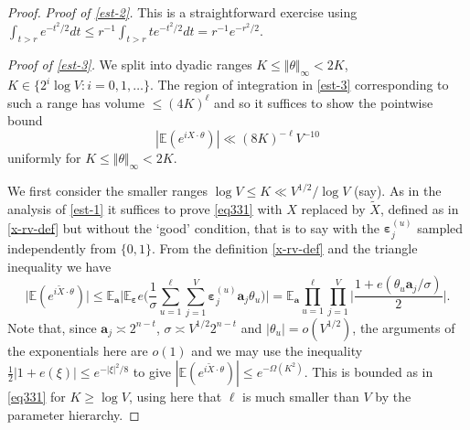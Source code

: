\documentclass[11pt,reqno]{amsart}
\numberwithin{equation}{section}
\theoremstyle{definition}
\theoremstyle{remark}
\newcommand{\mb}{\mathbb}
\newcommand{\mbf}{\mathbf}
\newcommand{\eps}{\varepsilon}
\def\boldeps{\boldsymbol\eps}
\renewcommand{\le}{\leqslant}
\renewcommand{\ge}{\geqslant}
\begin{document}
\begin{proof}
\emph{Proof of \cref{est-2}.} This is a straightforward exercise using $\int_{t > r} e^{-t^2/2} dt \le r^{-1} \int_{t > r} t e^{-t^2/2} dt = r^{-1} e^{-r^2/2}$.\vspace*{8pt}

\emph{Proof of \cref{est-3}.} We split into dyadic ranges $K \le \Vert \theta \Vert_{\infty} < 2K$, $K \in \{ 2^i \log V : i = 0,1,\dots\}$. The region of integration in \cref{est-3} corresponding to such a range has volume $\le (4K)^{\ell}$ and so it suffices to show the pointwise bound
\begin{equation} \label{eq331} |\mb{E}(e^{i X \cdot \theta})| \ll (8 K)^{-\ell} V^{-10}\end{equation}
 uniformly for $K \le \Vert \theta \Vert_{\infty} < 2K$. 

We first consider the smaller ranges $\log V \le K \ll V^{1/2}/\log V$ (say). As in the analysis of \cref{est-1} it suffices to prove \cref{eq331} with $X$ replaced by $\tilde X$, defined as in \cref{x-rv-def} but without the `good' condition, that is to say with the $\boldeps_j^{(u)}$ sampled independently from $\{0,1\}$. From the definition \cref{x-rv-def} and the triangle inequality we have 
\[ \big|\mb{E}(e^{i \tilde X \cdot \theta})\big|  \le  \mb{E}_{\mbf{a}}\Big| \mb{E}_{\boldeps} e\big( \frac{1}{\sigma} \sum_{u = 1}^{\ell} \sum_{j = 1}^V \boldeps_j^{(u)} \mbf{a}_j \theta_u \big) \Big|  = \mb{E}_{\mbf{a}} \prod_{u = 1}^{\ell} \prod_{j = 1}^V \Big| \frac{1 + e(\theta_u \mbf{a}_j/\sigma)}{2} \Big|.
 \]
Note that, since $\mbf{a}_j \asymp 2^{n - t}$, $\sigma \asymp V^{1/2} 2^{n - t}$ and $|\theta_u| = o(V^{1/2})$, the arguments of the exponentials here are $o(1)$ and we may use the inequality $\frac{1}{2}|1 + e(\xi)| \le e^{-|\xi|^2/8}$ to give $|\mb{E}(e^{i \tilde X \cdot \theta})| \le e^{-\Omega(K^2)}$. This is bounded as in \cref{eq331} for $K \ge \log V$, using here that $\ell$ is much smaller than $V$ by the parameter hierarchy.


\end{proof}
\end{document}
